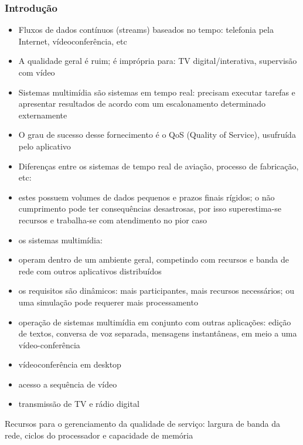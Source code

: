 \documentclass[]{beamer}
\begin{document}
\begin{frame}[allowframebreaks]
  \frametitle{Introdução}
\begin{itemize}
  \item Fluxos de dados contínuos (streams) baseados no tempo: telefonia pela Internet, 
vídeoconferência, etc
  \item A qualidade geral é ruim; é imprópria para: TV digital/interativa, supervisão com vídeo
  \item Sistemas multimídia são sistemas em tempo real: precisam executar tarefas e apresentar
resultados de acordo com um escalonamento determinado externamente
  \item O grau de sucesso desse fornecimento é o QoS (Quality of Service), usufruída
pelo aplicativo
  \item Diferenças entre os sistemas de tempo real de aviação, processo de fabricação, etc: 
  \item estes possuem volumes de dados pequenos e prazos finais rígidos; o não cumprimento pode ter
consequências desastrosas, por isso superestima-se recursos e trabalha-se com atendimento 
no pior caso
  \item os sistemas multimídia:
  \item operam dentro de um ambiente geral, competindo com recursos e banda de rede com
 outros aplicativos distribuídos
  \item os requisitos são dinâmicos: mais participantes, mais recursos necessários; ou uma 
simulação pode requerer mais processamento
  \item operação de sistemas multimídia em conjunto com outras aplicações: edição de textos, 
conversa de voz separada, mensagens instantâneas, em meio a uma vídeo-conferência
    \item vídeoconferência em desktop
    \item acesso a sequência de vídeo
    \item transmissão de TV e rádio digital
  \end{itemize}
  Recursos para o gerenciamento da qualidade de serviço: largura de banda da rede, ciclos do
processador e capacidade de memória
\end{frame}
\end{document}
